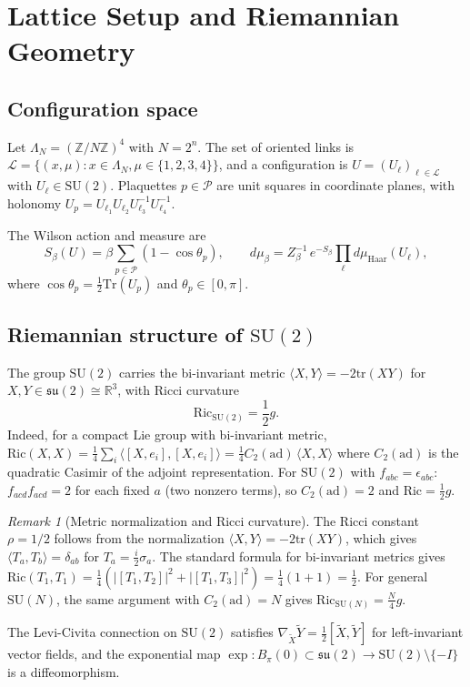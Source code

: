 \documentclass[11pt,a4paper]{article}
\theoremstyle{plain}
\theoremstyle{definition}
\theoremstyle{remark}
\newtheorem{remark}[theorem]{Remark}
\newcommand{\R}{\mathbb{R}}
\newcommand{\Z}{\mathbb{Z}}
\newcommand{\SU}{\mathrm{SU}}
\newcommand{\su}{\mathfrak{su}}
\newcommand{\tr}{\mathrm{tr}}
\newcommand{\Tr}{\mathrm{Tr}}
\newcommand{\Ric}{\mathrm{Ric}}
\newcommand{\ip}[2]{\langle #1, #2 \rangle}
\newcommand{\cL}{\mathcal{L}}
\newcommand{\cP}{\mathcal{P}}
\begin{document}
\section{Lattice Setup and Riemannian Geometry}\label{sec:setup}

\subsection{Configuration space}

Let $\Lambda_N = (\Z/N\Z)^4$ with $N = 2^n$. The set of oriented links is
$\cL = \{(x,\mu) : x \in \Lambda_N, \mu \in \{1,2,3,4\}\}$, and a
configuration is $U = (U_\ell)_{\ell \in \cL}$ with $U_\ell \in \SU(2)$.
Plaquettes $p \in \cP$ are unit squares in coordinate planes, with
holonomy $U_p = U_{\ell_1}U_{\ell_2}U_{\ell_3}^{-1}U_{\ell_4}^{-1}$.

The Wilson action and measure are
\begin{equation}
S_\beta(U) = \beta \sum_{p \in \cP}(1 - \cos\theta_p), \qquad
d\mu_\beta = Z_\beta^{-1}\,e^{-S_\beta}\prod_\ell d\mu_{\mathrm{Haar}}(U_\ell),
\end{equation}
where $\cos\theta_p = \frac{1}{2}\Tr(U_p)$ and $\theta_p \in [0,\pi]$.

\subsection{Riemannian structure of $\SU(2)$}

The group $\SU(2)$ carries the bi-invariant metric
$\ip{X}{Y} = -2\tr(XY)$ for $X, Y \in \su(2) \cong \R^3$, with
Ricci curvature
\begin{equation}\label{eq:ricci}
\Ric_{\SU(2)} = \frac{1}{2}g.
\end{equation}
Indeed, for a compact Lie group with bi-invariant metric, 
$\Ric(X,X) = \frac{1}{4}\sum_{i}\ip{[X,e_i]}{[X,e_i]}
= \frac{1}{4}C_2(\mathrm{ad})\,\ip{X}{X}$
where $C_2(\mathrm{ad})$ is the quadratic Casimir of the adjoint
representation. For $\SU(2)$ with $f_{abc} = \epsilon_{abc}$:
$f_{acd}f_{acd} = 2$ for each fixed $a$ (two nonzero terms),
so $C_2(\mathrm{ad}) = 2$ and $\Ric = \frac{1}{2}g$.

\begin{remark}[Metric normalization and Ricci curvature]\label{rem:ricci-normalization}
The Ricci constant $\rho = 1/2$ follows from the normalization
$\ip{X}{Y} = -2\tr(XY)$, which gives $\ip{T_a}{T_b} = \delta_{ab}$
for $T_a = \frac{i}{2}\sigma_a$. The standard formula for bi-invariant
metrics gives $\Ric(T_1,T_1) = \frac{1}{4}(|[T_1,T_2]|^2 + |[T_1,T_3]|^2)
= \frac{1}{4}(1+1) = \frac{1}{2}$.
For general $\SU(N)$, the same argument with $C_2(\mathrm{ad}) = N$ gives
$\Ric_{\SU(N)} = \frac{N}{4}g$.
\end{remark}
The Levi-Civita connection on $\SU(2)$ satisfies
$\nabla_{\tilde{X}}\tilde{Y} = \frac{1}{2}[\tilde{X},\tilde{Y}]$
for left-invariant vector fields, and the exponential map
$\exp: B_\pi(0) \subset \su(2) \to \SU(2)\setminus\{-I\}$
is a diffeomorphism.
\end{document}
